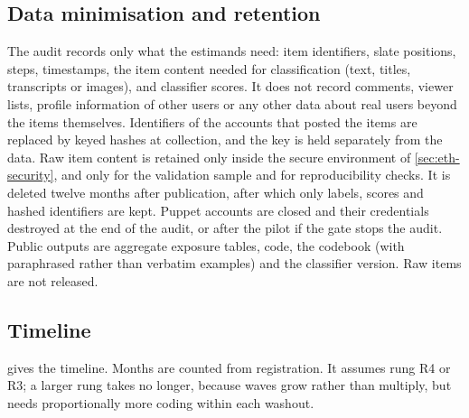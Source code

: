 \subsection{Data minimisation and retention}\label{sec:prot-data}

The audit records only what the estimands need: item identifiers, slate positions, steps, timestamps, the item content needed for classification (text, titles, transcripts or images), and classifier scores. It does not record comments, viewer lists, profile information of other users or any other data about real users beyond the items themselves. Identifiers of the accounts that posted the items are replaced by keyed hashes at collection, and the key is held separately from the data. Raw item content is retained only inside the secure environment of \cref{sec:eth-security}, and only for the validation sample and for reproducibility checks. It is deleted twelve months after publication, after which only labels, scores and hashed identifiers are kept. Puppet accounts are closed and their credentials destroyed at the end of the audit, or after the pilot if the gate stops the audit. Public outputs are aggregate exposure tables, code, the codebook (with paraphrased rather than verbatim examples) and the classifier version. Raw items are not released.

\subsection{Timeline}\label{sec:prot-timeline}

 gives the timeline. Months are counted from registration. It assumes rung R4 or R3; a larger rung takes no longer, because waves grow rather than multiply, but needs proportionally more coding within each washout.

